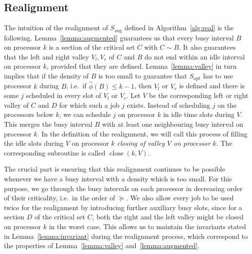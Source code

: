 \documentclass[a4paper]{article}
\DeclareMathOperator{\opt}{opt}
\DeclareMathOperator{\aug}{aug}
\DeclareMathOperator{\close}{close}
\begin{document}
\subsection{Realignment}\label{section:realignment}
The intuition of the realignment of $S_{\aug}$ defined in Algorithm~\ref{alg:real} is the following.
Lemma~\ref{lemma:augmented} guarantees us that every busy interval $B$ on processor $k$ is a section of the critical set $C$ with $C \sim B$.
It also guarantees that the left and right valley $V_l, V_r$ of $C$ and $B$ do not end within an idle interval on processor $k$, provided that they are defined.
Lemma~\ref{lemma:valley} in turn implies that if the density of $B$ is too small to guarantee that $S_{\opt}$ has to use processor $k$ during $B$, i.e.\ if $\hat \phi(B) \leq k - 1$, then $V_l$ or $V_r$ is defined and there is some $j$ scheduled in every slot of $V_l$ or $V_r$.
Let $V$ be the corresponding left or right valley of $C$ and $D$ for which such a job $j$ exists.
Instead of scheduling $j$ on the processors below $k$, we can schedule $j$ on processor $k$ in idle time slots during $V$.
This merges the busy interval $B$ with at least one neighbouring busy interval on processor $k$.
In the definition of the realignment, we will call this process of filling the idle slots during $V$ on processor $k$ \emph{closing of valley $V$ on processor $k$}.
The corresponding subroutine is called $\close(k, V)$.

The crucial part is ensuring that this realignment continues to be possible whenever we have a busy interval with a density which is too small.
For this purpose, we go through the busy intervals on each processor in decreasing order of their criticality, i.e.\ in the order of $\succeq$.
We also allow every job to be used twice for the realignment by introducing further auxiliary busy slots, since for a section $D$ of the critical set $C$, both the right and the left valley might be closed on processor $k$ in the worst case.
This allows us to maintain the invariants stated in Lemma~\ref{lemma:invariant} during the realignment process, which correspond to the properties of Lemma~\ref{lemma:valley} and~\ref{lemma:augmented}.
\end{document}
